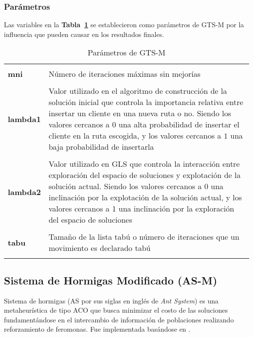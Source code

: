 \subsubsection*{Parámetros}

Las variables en la \textbf{Tabla~\ref{table:param-gts}} se establecieron como parámetros de GTS-M por la influencia que pueden causar en los resultados finales.

\begin{table}[ht]
\centering
\small
\caption{Parámetros de GTS-M}
\begin{tabular}{l||p{15cm}}
\hline\hline\\
\textbf{mni} & Número de iteraciones máximas sin mejorías\\ [0.7ex]\cline{2-2}\\
\textbf{lambda1} & Valor utilizado en el algoritmo de construcción de la solución inicial que controla
					la importancia relativa entre insertar un cliente en una nueva ruta o no. Siendo los valores cercanos a $0$ una alta probabilidad de
				 	insertar el cliente en la ruta escogida, y los valores cercanos a $1$ una baja probabilidad
				 	de insertarla\\ [0.7ex]\cline{2-2}\\
\textbf{lambda2} & Valor utilizado en GLS que controla la interacción entre exploración del espacio de soluciones
					y explotación de la solución actual. Siendo los valores cercanos a 0 una inclinación por la
					explotación de la solución actual, y los valores cercanos a 1 una inclinación por la exploración
					del espacio de soluciones\\ [0.7ex]\cline{2-2}\\
\textbf{tabu} & Tamaño de la lista tabú o número de iteraciones que un movimiento es declarado tabú\\
\\ \hline\hline
\end{tabular}
\label{table:param-gts}
\end{table}

\subsection{Sistema de Hormigas Modificado (AS-M)} \label{sect:implementacion-aco}

Sistema de hormigas (AS por sus siglas en inglés de \emph{Ant System}) es una metaheurística de tipo ACO que busca minimizar el costo de las soluciones fundamentándose en el intercambio de información de poblaciones realizando reforzamiento de feromonas. Fue implementada basándose en \cite{maco}.

